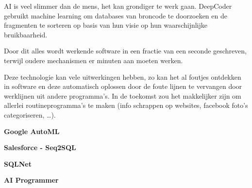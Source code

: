 AI is veel slimmer dan de mens, het kan grondiger te werk gaan. DeepCoder gebruikt machine learning om databases van broncode te doorzoeken en de fragmenten te sorteren op basis van hun visie op hun waarschijnlijke bruikbaarheid.

Door dit alles wordt werkende software in een fractie van een seconde geschreven, terwijl oudere mechanismen er minuten aan moeten werken.

Deze technologie kan vele uitwerkingen hebben, zo kan het al foutjes ontdekken in software en deze automatisch oplossen door de foute lijnen te vervangen door werklijnen uit andere programma’s. In de toekomst zou het makkelijker zijn om allerlei routineprogramma’s te maken (info schrappen op websites, facebook foto’s categoriseren, …).

\textbf{Google AutoML}

\textbf{Salesforce - Seq2SQL}

\textbf{SQLNet}

\textbf{AI Programmer}